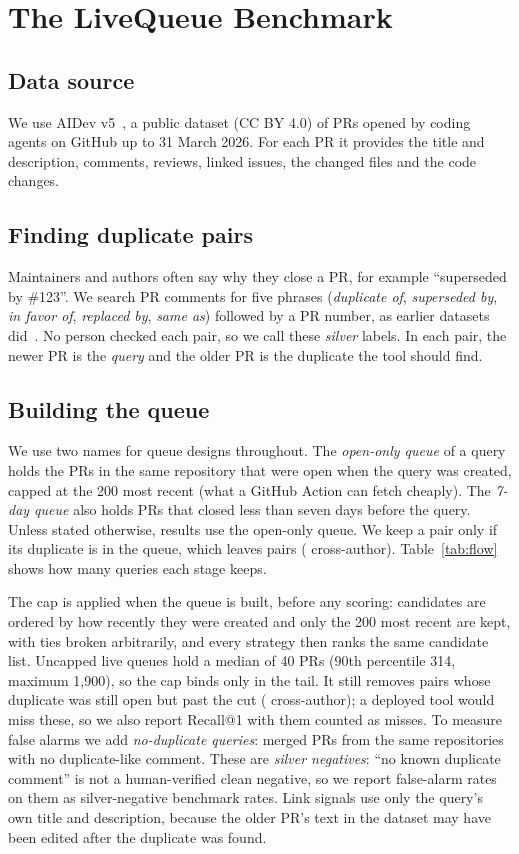 \documentclass[10pt,conference]{IEEEtran}
\begin{document}
\section{The LiveQueue Benchmark}
\subsection{Data source}
We use AIDev v5~\cite{li2026aidev}, a public dataset (CC BY 4.0) of PRs opened by coding agents on GitHub up to 31 March 2026. For each PR it provides the title and description, comments, reviews, linked issues, the changed files and the code changes.

\subsection{Finding duplicate pairs}
Maintainers and authors often say why they close a PR, for example ``superseded by \#123''. We search PR comments for five phrases (\emph{duplicate of}, \emph{superseded by}, \emph{in favor of}, \emph{replaced by}, \emph{same as}) followed by a PR number, as earlier datasets did~\cite{yu2018dataset,galbraith2025duplicate}. No person checked each pair, so we call these \emph{silver} labels. In each pair, the newer PR is the \emph{query} and the older PR is the duplicate the tool should find.

\subsection{Building the queue}
We use two names for queue designs throughout. The \emph{open-only queue} of a query holds the PRs in the same repository that were open when the query was created, capped at the 200 most recent (what a GitHub Action can fetch cheaply). The \emph{7-day queue} also holds PRs that closed less than seven days before the query. Unless stated otherwise, results use the open-only queue. We keep a pair only if its duplicate is in the queue, which leaves \nPairs{} pairs (\nCross{} cross-author). Table~\ref{tab:flow} shows how many queries each stage keeps.

The cap is applied when the queue is built, before any scoring: candidates are ordered by how recently they were created and only the 200 most recent are kept, with ties broken arbitrarily, and every strategy then ranks the same candidate list. Uncapped live queues hold a median of 40 PRs (90th percentile 314, maximum 1{,}900), so the cap binds only in the tail. It still removes \capAll{} pairs whose duplicate was still open but past the cut (\capCross{} cross-author); a deployed tool would miss these, so we also report Recall@1 with them counted as misses. To measure false alarms we add \nNeg{} \emph{no-duplicate queries}: merged PRs from the same repositories with no duplicate-like comment. These are \emph{silver negatives}: ``no known duplicate comment'' is not a human-verified clean negative, so we report false-alarm rates on them as silver-negative benchmark rates. Link signals use only the query's own title and description, because the older PR's text in the dataset may have been edited after the duplicate was found.
\end{document}

